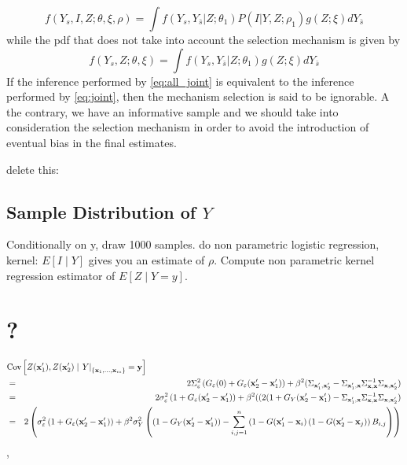 \documentclass[12pt]{article}
\theoremstyle{definition}
\theoremstyle{remark}
\newcommand{\paramnuisance}{\xi}
\newcommand{\provar}{\Sigma}
\newcommand{\Cov}{\mathrm{Cov}}
\newcommand{\Semivariogram}{G}
\newcommand{\indicator}{I}
\newcommand{\position}{\mathbf{x}}
\newcommand{\Signal}{Y}
\newcommand{\signal}{\mathbf{y}}
\newcommand{\Desvar}{Z}
\begin{document}
\begin{equation} \label{eq:all_joint}
    f\left(\Signal_{s},\indicator,\Desvar;\theta,\paramnuisance,\rho\right)=\int{f\left(\Signal_{s},\Signal_{\bar{s}}|\Desvar;\theta_{1}\right)P\left(\indicator|\Signal,\Desvar;\rho_{1}\right)g\left(\Desvar;\paramnuisance\right)d\Signal_{\bar{s}}}
\end{equation}
while the pdf that does not take into account the selection mechanism is given by
\begin{equation} \label{eq:joint}
    f\left(\Signal_{s},\Desvar;\theta,\paramnuisance\right)=\int{f\left(\Signal_{s},\Signal_{\bar{s}}|\Desvar;\theta_{1}\right)g\left(\Desvar;\paramnuisance\right)d\Signal_{\bar{s}}}
\end{equation}
If the inference performed by \eqref{eq:all_joint} is equivalent to the inference performed by \eqref{eq:joint}, then the mechanism selection is said to be ignorable. A the contrary, we have an informative sample and we should take into consideration the selection mechanism in order to avoid the introduction of eventual bias in the final estimates.


{\color{red} delete this:\subsection{Sample Distribution of $\Signal$}




Conditionally on y, draw 1000 samples.
do non parametric logistic regression,
kernel: $E[I\mid Y]$ gives you an estimate of $\rho$.
Compute non parametric kernel regression estimator of $E[Z\mid Y=y]$.


\section{?}
\begin{eqnarray*}
\lefteqn{\Cov\left[\Desvar(\position'_1),\Desvar(\position'_2)\mid \left.\Signal\right|_{\{\position_{1},\dots,\position_{m}\}}=\signal
\right]}\\&=&2\provar^2_\varepsilon \left(\Semivariogram_\varepsilon(0)+\Semivariogram_\varepsilon(\position_2'-\position_1')\right)+\beta^2(
\provar_{\position'_1,\position'_2}-\provar_{\position'_1,\position}\provar_{\position,\position}^{-1}\provar_{\position,\position'_2})\\
&=& 2\sigma^2_\varepsilon \left(1+\Semivariogram_\varepsilon(\position_2'-\position_1')\right)+\beta^2(
(2(1+\Semivariogram_\Signal(\position'_2-\position'_1)-\provar_{\position'_1,\position}\provar_{\position,\position}^{-1}\provar_{\position,\position'_2})\\
&=& 2\left(\sigma^2_\varepsilon \left(1+\Semivariogram_\varepsilon(\position_2'-\position_1')\right)+\beta^2
\sigma^2_Y\left(\left(1-\Semivariogram_\Signal(\position'_2-\position'_1)\right)-\sum_{i,j=1}^n \left(1-\Semivariogram(\position'_1-\position_i\right)\left(1-\Semivariogram(\position'_2-\position_j)\right)B_{i,j}\right)\right)
\end{eqnarray*},

}
\end{document}
